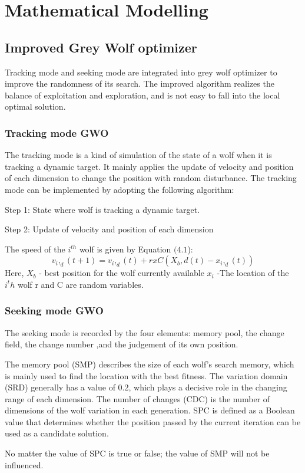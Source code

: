 \documentclass[11pt]{report}
\begin{document}
\chapter{Mathematical Modelling}

\section{Improved Grey Wolf optimizer}
Tracking mode and seeking
mode are integrated into grey wolf optimizer to improve the
randomness of its search. The improved algorithm realizes
the balance of exploitation and exploration, and is not easy to
fall into the local optimal solution.

\subsection{Tracking mode GWO}
\par The tracking mode is a kind of simulation of the state of a
wolf when it is tracking a dynamic target. It mainly applies the
update of velocity and position of each dimension to change
the position with random disturbance. 
The tracking mode can be implemented by adopting the following algorithm:
\item[Step 1:] State where wolf is tracking a dynamic target.
\item[Step 2:]Update of velocity and position of each dimension
\par The speed of the $i^{th}$ wolf is given by Equation $(4.1$):
\begin{equation}
v_i,_d(t+1) = v_i,_d(t) + r x C (X_b,d(t)-x_i,_d(t))
\end{equation}
Here,
$X_b$ -  best position for the wolf currently available
$x_i$ -The location of the $i^th $ wolf 
r and C are random variables.

\subsection{Seeking mode GWO}
The seeking mode is recorded by the four elements: memory pool, the change field, the change number
,and the judgement of its own position. 
\par The memory pool (SMP) describes the size of each wolf's search memory, which is mainly used to find the location with the
best fitness. The variation domain (SRD) generally has a value
of 0.2, which plays a decisive role in the changing range of
each dimension. The number of changes (CDC) is the number
of dimensions of the wolf variation in each generation. SPC
is defined as a Boolean value that determines whether the
position passed by the current iteration can be used as a
candidate solution. 
\par No matter the value of SPC
is true or false; the value of SMP will not be influenced.
\end{document}
